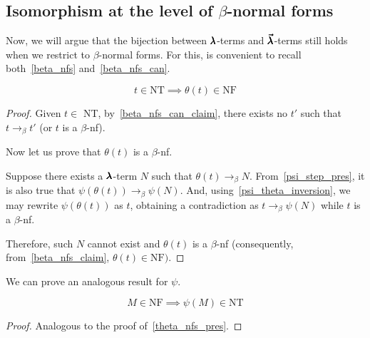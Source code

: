 
\subsection{Isomorphism at the level of $\beta$-normal forms}

Now, we will argue that the bijection between $\pmb{\lambda}$-terms and $\pmb{\vec \lambda}$-terms still holds when we restrict to $\beta$-normal forms.
For this, is convenient to recall both~\cref{beta_nfs} and~\cref{beta_nfs_can}.

\begin{theorem}
  \label{theta_nfs_pres}
  \[ t \in \text{NT} \implies \theta(t) \in \text{NF} \]
\end{theorem}
\begin{proof}
  Given $t \in$ NT, by~\cref{beta_nfs_can_claim}, there exists no $t'$ such that $t \to_\beta t'$ (or $t$ is a $\beta$-nf).

  Now let us prove that $\theta(t)$ is a $\beta$-nf.

  Suppose there exists a $\pmb{\lambda}$-term $N$ such that $\theta(t) \to_\beta N$.
  From~\cref{psi_step_pres}, it is also true that $\psi(\theta(t)) \to_\beta \psi(N)$.
  And, using~\cref{psi_theta_inversion}, we may rewrite $\psi(\theta(t))$ as $t$, obtaining a contradiction as $t \to_\beta \psi(N)$ while $t$ is a $\beta$-nf.

  Therefore, such $N$ cannot exist and $\theta(t)$ is a $\beta$-nf (consequently, from~\cref{beta_nfs_claim}, $\theta(t) \in \text{NF})$.
\end{proof}

We can prove an analogous result for $\psi$. 

\begin{theorem}
  \[ M \in \text{NF} \implies \psi(M) \in \text{NT} \]
\end{theorem}
\begin{proof}
  Analogous to the proof of~\cref{theta_nfs_pres}.
\end{proof}


